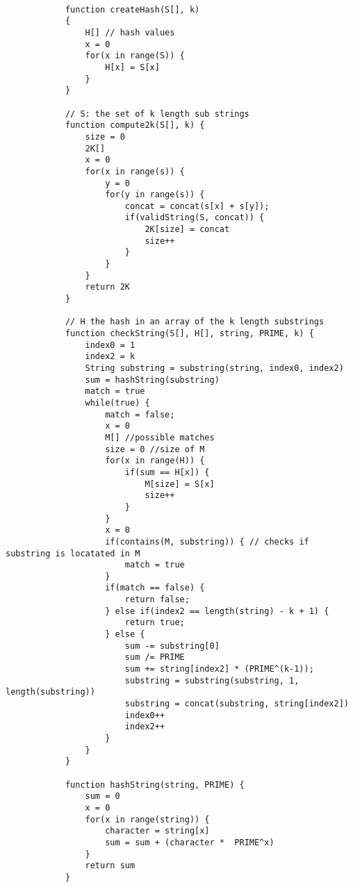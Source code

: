 \documentclass[11pt]{article}
\begin{document}
        \begin{verbatim}
            
            function createHash(S[], k)
            {
                H[] // hash values
                x = 0
                for(x in range(S)) {
                    H[x] = S[x]
                }
            }
            
            // S: the set of k length sub strings
            function compute2k(S[], k) {
                size = 0
                2K[] 
                x = 0
                for(x in range(s)) {
                    y = 0
                    for(y in range(s)) {
                        concat = concat(s[x] + s[y]);
                        if(validString(S, concat)) {
                            2K[size] = concat
                            size++
                        }
                    }
                }
                return 2K
            }
            
            // H the hash in an array of the k length substrings
            function checkString(S[], H[], string, PRIME, k) {
                index0 = 1
                index2 = k
                String substring = substring(string, index0, index2)
                sum = hashString(substring)
                match = true
                while(true) {
                    match = false;
                    x = 0
                    M[] //possible matches
                    size = 0 //size of M
                    for(x in range(H)) {
                        if(sum == H[x]) {
                            M[size] = S[x]
                            size++
                        }
                    }
                    x = 0
                    if(contains(M, substring)) { // checks if substring is locatated in M
                        match = true
                    }
                    if(match == false) {
                        return false;
                    } else if(index2 == length(string) - k + 1) {
                        return true;
                    } else {
                        sum -= substring[0]
                        sum /= PRIME
                        sum += string[index2] * (PRIME^(k-1));
                        substring = substring(substring, 1, length(substring))
                        substring = concat(substring, string[index2])
                        index0++
                        index2++
                    }
                }
            }
            
            function hashString(string, PRIME) {
                sum = 0
                x = 0
                for(x in range(string)) {
                    character = string[x]
                    sum = sum + (character *  PRIME^x)
                }
                return sum
            }
                       
                        
        \end{verbatim}
\end{document}
